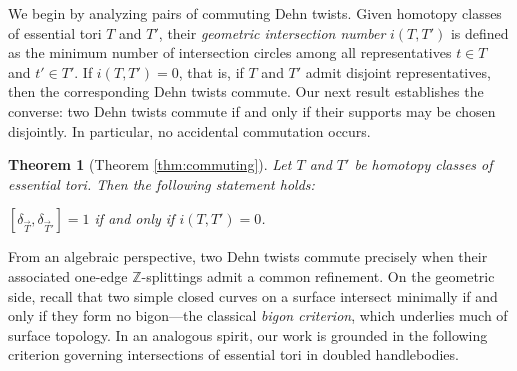 \documentclass[12pt,a4paper]{amsart}
\numberwithin{equation}{section}
\DeclareMathOperator{\MCG}{MCG}
\DeclareMathOperator{\Out}{Out}
\newcommand{\MM}{\mathbb{M}}
\theoremstyle{plain}
\newtheorem{theorem}{Theorem}[section]
\theoremstyle{definition}
\theoremstyle{remark}
\begin{document}
We begin by analyzing pairs of commuting Dehn twists.
Given homotopy classes of essential tori \(T\) and \(T'\), their \emph{geometric intersection number} \(i(T, T')\) is defined as the minimum number of intersection circles among all representatives \(t \in T\) and \(t' \in T'\).
If \(i(T, T') = 0\), that is, if \(T\) and \(T'\) admit disjoint representatives, then the corresponding Dehn twists commute.
Our next result establishes the converse: two Dehn twists commute if and only if their supports may be chosen disjointly.
In particular, no accidental commutation occurs.




\begin{theorem}[Theorem \ref{thm:commuting}]
    Let $T$ and $T'$ be homotopy classes of essential tori.
    Then the following statement holds:
    \begin{center}
        $[\delta_{\vec{T}}, \delta_{\vec{T}'}] = 1$ if and only if $i(T, T') = 0$.
    \end{center}
\end{theorem}


From an algebraic perspective, two Dehn twists commute precisely when their associated one-edge $\mathbb{Z}$-splittings admit a common refinement.
On the geometric side, recall that two simple closed curves on a surface intersect minimally if and only if they form no bigon---the classical \emph{bigon criterion}, which underlies much of surface topology.
In an analogous spirit, our work is grounded in the following criterion governing intersections of essential tori in doubled handlebodies.
\end{document}
